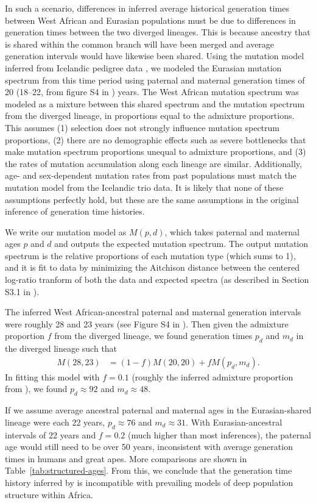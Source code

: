 \documentclass[]{article}
\begin{document}
In such a scenario, differences in inferred average historical generation times
between West African and Eurasian populations must be due to differences in
generation times between the two diverged lineages. This is because ancestry
that is shared within the common branch will have been merged and average
generation intervals would have likewise been shared.
Using the mutation model
\citet{wang2023human} inferred from Icelandic pedigree data
\citep{jonsson2017parental}, we modeled the Eurasian mutation spectrum from
this time period using paternal and maternal generation times of 20 (18--22,
from figure S4 in \citeauthor{wang2023human}) years. The West African mutation
spectrum was modeled as a mixture between this shared spectrum and the mutation
spectrum from the diverged lineage, in proportions equal to the admixture
proportions. This assumes (1) selection does not strongly influence mutation
spectrum proportions, (2) there are no demographic effects such as severe
bottlenecks that make mutation spectrum proportions unequal to admixture
proportions, and (3) the rates of mutation accumulation along each lineage are
similar. Additionally, age- and sex-dependent mutation rates from past
populations must match the mutation model from the Icelandic trio data. It is
likely that none of these assumptions perfectly hold, but these are the same
assumptions in the original inference of generation time histories.

We write our mutation model as $M(p, d)$, which takes paternal and maternal
ages $p$ and $d$ and outputs the expected mutation spectrum. The output
mutation spectrum is the relative proportions of each mutation type (which sums
to 1), and it is fit to data by minimizing the Aitchison distance between the
centered log-ratio tranform of both the data and expected spectra (as described
in Section S3.1 in \citet{wang2023human}).

The inferred West African-ancestral paternal and maternal generation intervals
were roughly 28 and 23 years (see Figure S4 in \citet{wang2023human}). Then
given the admixture proportion $f$ from the diverged lineage, we found
generation times $p_d$ and $m_d$ in the diverged lineage such that
\begin{align*}
    M(28, 23) & = (1-f)M(20, 20) + fM(p_d, m_d).
\end{align*}
In fitting this model with $f=0.1$ (roughly the inferred admixture proportion
from \citet{durvasula2020recovering}), we found $p_d\approx92$ and
$m_d\approx48$.

If we assume average ancestral paternal and maternal ages in the
Eurasian-shared lineage were each 22 years, $p_d\approx76$ and $m_d\approx31$. 
With Eurasian-ancestral intervals of 22 years and $f=0.2$ (much higher than
most inferences), the paternal age would still need to be over 50 years,
inconsistent with average generation times in humans and great apes.
More comparisons are shown in Table~\ref{tab:structured-ages}.
From this, we conclude that the generation time history inferred by
\citet{wang2023human} is incompatible with prevailing models of deep population
structure within Africa.
\end{document}
